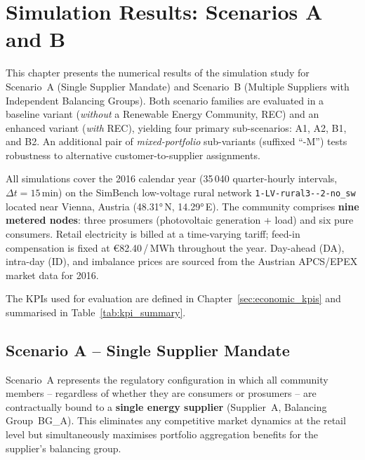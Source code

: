%

\chapter{Simulation Results: Scenarios A and B}
\label{chap:results_AB}

This chapter presents the numerical results of the simulation study for Scenario~A
(Single Supplier Mandate) and Scenario~B (Multiple Suppliers with Independent
Balancing Groups).  Both scenario families are evaluated in a baseline variant
(\emph{without} a Renewable Energy Community, REC) and an enhanced variant
(\emph{with} REC), yielding four primary sub-scenarios: A1, A2, B1, and B2.
An additional pair of \emph{mixed-portfolio} sub-variants (suffixed ``-M'') tests
robustness to alternative customer-to-supplier assignments.

All simulations cover the 2016 calendar year (35\,040 quarter-hourly
intervals, $\Delta t = 15\,\text{min}$) on the SimBench low-voltage rural
network \texttt{1-LV-rural3-{}-2-no\_sw} located near Vienna, Austria
(48.31°\,N, 14.29°\,E).  The community comprises \textbf{nine metered nodes}:
three prosumers (photovoltaic generation + load) and six pure consumers.
Retail electricity is billed at a time-varying tariff; feed-in compensation is
fixed at €82.40\,/\,MWh throughout the year.  Day-ahead (DA), intra-day (ID),
and imbalance prices are sourced from the Austrian APCS/EPEX market data for
2016.

The KPIs used for evaluation are defined in Chapter~\ref{sec:economic_kpis}
and summarised in Table~\ref{tab:kpi_summary}.


\section{Scenario A -- Single Supplier Mandate}
\label{sec:results_A}

Scenario~A represents the regulatory configuration in which all community
members -- regardless of whether they are consumers or prosumers -- are contractually
bound to a \textbf{single energy supplier} (Supplier~A, Balancing Group~BG\_A).
This eliminates any competitive market dynamics at the retail level but
simultaneously maximises portfolio aggregation benefits for the supplier's
balancing group.

